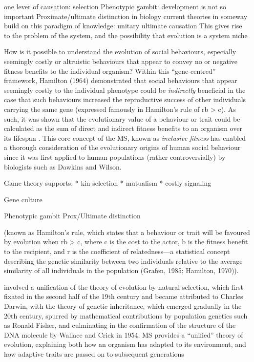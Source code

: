 one lever of causation: selection 
Phenotypic gambit: development is not so important
Proximate/ultimate distinction in biology
current theories in someway build on this paradigm of knowledge: unitary ultimate causation
This gives rise to the problem of the system, and the possibility that evolution is a system niche


How is it possible to understand the evolution of social behaviours, especially seemingly costly or altruistic behaviours that appear to convey no or negative fitness benefits to the individual organism? Within this ``gene-centred'' framework, Hamilton (1964) demonstrated that social behaviours that appear seemingly costly to the individual phenotype could be \textit{indirectly} beneficial in the case that such behaviours increased the reproductive success of other individuals carrying the same gene (expressed famously in Hamilton’s rule of rb > c).  As such, it was shown that the evolutionary value of a behaviour or trait could be calculated as the sum of direct and indirect fitness benefits to an organism over its lifespan \citep{Grafen2006}.  This core concept of the MS, known as \textit{inclusive fitness} has enabled a thorough consideration of the evolutionary origins of human social behaviour since it was first applied to human populations (rather controversially) by biologists such as Dawkins and Wilson.

Game theory supports:
* kin selection
* mutualism
* costly signaling


Gene culture

Phenotypic gambit
Prox/Ultimate distinction







(known as Hamilton’s rule, which states that a behaviour or trait will be favoured by evolution when rb > c, where c is the cost to the actor, b is the fitness benefit to the recipient, and r is the coefficient of relatedness—a statistical concept describing the genetic similarity between two individuals relative to the average similarity of all individuals in the population (Grafen, 1985; Hamilton, 1970)).


involved a unification of the theory of evolution by natural selection, which first fixated in the second half of the 19th century and became attributed to Charles Darwin, with the theory of genetic inheritance, which emerged gradually in the 20th century, spurred by mathematical contributions by population genetics such as Ronald Fisher, and culminating in the confirmation of the structure of the DNA molecule by Wallace and Crick in 1954.  MS provides a ``unified'' theory of evolution, explaining both how an organism has adapted to its environment, and how adaptive traits are passed on to subsequent generations

